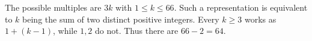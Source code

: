 The possible multiples are $3k$ with $1\le k\le66$. Such a representation is equivalent to $k$ being the sum of two distinct positive integers. Every $k\ge3$ works as $1+(k-1)$, while $1,2$ do not. Thus there are $66-2=\boxed{64}$.
